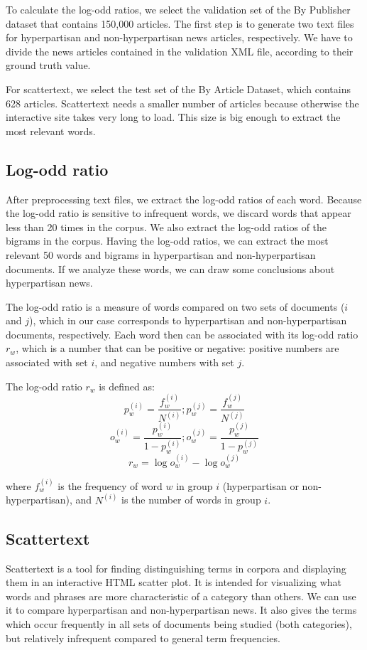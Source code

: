 \documentclass[11pt,a4paper]{article}
\begin{document}
To calculate the log-odd ratios, we select the validation set of the By Publisher dataset that contains 150,000 articles. The first step is to generate two text files for hyperpartisan and non-hyperpartisan news articles, respectively. We have to divide the news articles contained in the validation XML file, according to their ground truth value.

For scattertext, we select the test set of the By Article Dataset, which contains 628 articles. Scattertext needs a smaller number of articles because otherwise the interactive site takes very long to load. This size is big enough to extract the most relevant words.

\subsection{Log-odd ratio}

After preprocessing text files, we extract the log-odd ratios of each word. Because the log-odd ratio is sensitive to infrequent words, we discard words that appear less than 20 times in the corpus. We also extract the log-odd ratios of the bigrams in the corpus. Having the log-odd ratios, we can extract the most relevant 50 words and bigrams in hyperpartisan and non-hyperpartisan documents. If we analyze these words, we can draw some conclusions about hyperpartisan news.

The log-odd ratio is a measure of words compared on two sets of documents ($i$ and $j$), which in our case corresponds to hyperpartisan and non-hyperpartisan documents, respectively. Each word then can be associated with its log-odd ratio $r_w$, which is a number that can be positive or negative: positive numbers are associated with set $i$, and negative numbers with set $j$.

The log-odd ratio $r_w$ is defined as:
$$p_w^{(i)} = \frac{f_w^{(i)}}{N^{(i)}}; p_w^{(j)} = \frac{f_w^{(j)}}{N^{(j)}}$$
$$o_w^{(i)} = \frac{p_w^{(i)}}{1-p_w^{(i)}}; o_w^{(j)} = \frac{p_w^{(j)}}{1-p_w^{(j)}}$$
$$r_w = \log{o_w^{(i)}} - \log{o_w^{(j)}}$$

where $f_w^{(i)}$ is the frequency of word $w$ in group $i$ (hyperpartisan or non-hyperpartisan), and $N^{(i)}$ is the number of words in group $i$.

\subsection{Scattertext}

Scattertext \cite{kessler2017scattertext} is a tool for finding distinguishing terms in corpora and displaying them in an interactive HTML scatter plot. It is intended for visualizing what words and phrases are more characteristic of a category than others. We can use it to compare hyperpartisan and non-hyperpartisan news. It also gives the terms which occur frequently in all sets of documents being studied (both categories), but relatively infrequent compared to general term frequencies.
\end{document}

